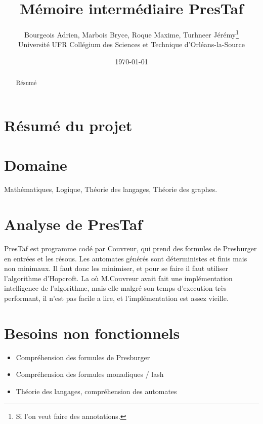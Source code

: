 \documentclass{article}%
\begin{document}
\title{M\'emoire interm\'ediaire PresTaf}
\author{Bourgeois Adrien, Marbois Bryce, Roque Maxime, Turhneer J\'er\'emy\thanks{Si l'on veut faire des annotations.}
\\Universit\'e UFR Coll\'egium des Sciences et Technique d'Orl\'eans-la-Source}
\date{\today}
\maketitle

\begin{abstract}
R\'esum\'e
\end{abstract}

\tableofcontents

\section{R\'esum\'e du projet}

\section{Domaine}

Math\'ematiques, Logique, Th\'eorie des langages, Th\'eorie des graphes.

\section{Analyse de PresTaf}

PresTaf est programme cod\'e par Couvreur, qui prend des formules de Presburger en entr\'ees et les r\'esous. Les automates g\'en\'er\'es sont d\'eterministes et finis mais non minimaux. Il faut donc les minimiser, et pour se faire il faut utiliser l'algorithme d'Hopcroft. La o\`u M.Couvreur avait fait une impl\'ementation intelligence de l'algorithme, mais elle malgr\'e son temps d'execution tr\`es performant, il n'est pas facile a lire, et l'impl\'ementation est assez vieille.

\section{Besoins non fonctionnels}

\begin{itemize}
\item Compr\'ehension des formules de Presburger
\item Compr\'ehension des formules monadiques / lash
\item Th\'eorie des langages, compr\'ehension des automates
\end{itemize}
\end{document}
